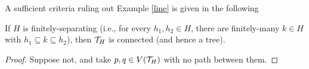 \documentclass{amsart}
\begin{document}
    A sufficient criteria ruling out Example \ref{line} is given in the following

    \begin{proposition}\label{tree-fs}
        If $H$ is finitely-separating (i.e., for every $h_1,h_2\in H$, there are finitely-many $k\in H$ with $h_1\subseteq k\subseteq h_2$), then $\mathcal{T}_H$ is connected (and hence a tree).
    \end{proposition}
    \begin{proof}
        Suppose not, and take $p,q\in V(\mathcal{T}_H)$ with no path between them.
    \end{proof}

    \begin{proposition}\label{tree-cv}
        
    \end{proposition}
\end{document}
